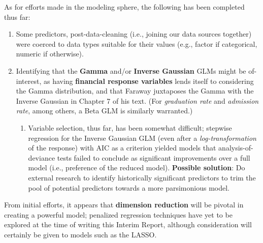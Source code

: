 \documentclass[a4paper,10pt]{article}
\begin{document}
\noindent
As for efforts made in the modeling sphere, the following has been completed thus far:
\begin{enumerate}
    \item Some predictors, post-data-cleaning (i.e., joining our data sources together) were coerced to data types suitable for their values (e.g., factor if categorical, numeric if otherwise).
    \item Identifying that the \textbf{Gamma} and/or \textbf{Inverse Gaussian} GLMs might be of-interest, as having \textbf{financial response variables} lends itself to considering the Gamma distribution, and that Faraway juxtaposes the Gamma with the Inverse Gaussian in Chapter 7 of his text. (For \textit{graduation rate} and \textit{admission rate}, among others, a Beta GLM is similarly warranted.) 
    \begin{enumerate}
        \item Variable selection, thus far, has been somewhat difficult; stepwise regression for the Inverse Gaussian GLM (even after a \textit{log-transformation} of the response) with AIC as a criterion yielded models that analysis-of-deviance tests failed to conclude as significant improvements over a full model (i.e., preference of the reduced model). \textbf{Possible solution}: Do external research to identify historically significant predictors to trim the pool of potential predictors towards a more parsimonious model.
    \end{enumerate}
\end{enumerate}
From initial efforts, it appears that \textbf{dimension reduction} will be pivotal in creating a powerful model; penalized regression techniques have yet to be explored at the time of writing this Interim Report, although consideration will certainly be given to models such as the LASSO.
\end{document}
